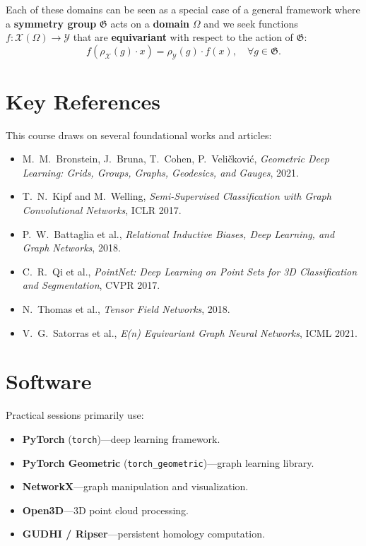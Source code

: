 \begin{remark}[Unification]
Each of these domains can be seen as a special case of a general framework where
a \textbf{symmetry group} $\mathfrak{G}$ acts on a \textbf{domain} $\Omega$ and
we seek functions $f: \mathcal{X}(\Omega) \to \mathcal{Y}$ that are
\textbf{equivariant} with respect to the action of $\mathfrak{G}$:
\[
    f(\rho_{\mathcal{X}}(g) \cdot x) = \rho_{\mathcal{Y}}(g) \cdot f(x),
    \quad \forall g \in \mathfrak{G}.
\]
\end{remark}

\section*{Key References}

This course draws on several foundational works and articles:
\begin{itemize}
    \item M.~M.~Bronstein, J.~Bruna, T.~Cohen, P.~Veli\v{c}kovi\'c,
          \textit{Geometric Deep Learning: Grids, Groups, Graphs, Geodesics,
          and Gauges}, 2021.
    \item T.~N.~Kipf and M.~Welling, \textit{Semi-Supervised Classification with
          Graph Convolutional Networks}, ICLR 2017.
    \item P.~W.~Battaglia et al., \textit{Relational Inductive Biases, Deep
          Learning, and Graph Networks}, 2018.
    \item C.~R.~Qi et al., \textit{PointNet: Deep Learning on Point Sets for
          3D Classification and Segmentation}, CVPR 2017.
    \item N.~Thomas et al., \textit{Tensor Field Networks}, 2018.
    \item V.~G.~Satorras et al., \textit{E(n) Equivariant Graph Neural Networks},
          ICML 2021.
\end{itemize}

\section*{Software}

Practical sessions primarily use:
\begin{itemize}
    \item \textbf{PyTorch} (\texttt{torch})---deep learning framework.
    \item \textbf{PyTorch Geometric} (\texttt{torch\_geometric})---graph learning
          library.
    \item \textbf{NetworkX}---graph manipulation and visualization.
    \item \textbf{Open3D}---3D point cloud processing.
    \item \textbf{GUDHI / Ripser}---persistent homology computation.
\end{itemize}

